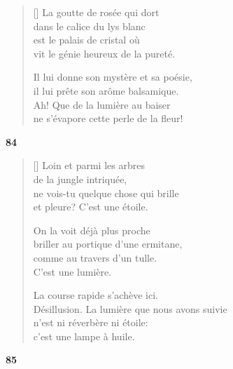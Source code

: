\documentclass[a4paper,12pt]{book}
\begin{document}
\settowidth{\versewidth}{Il lui donne son mystère et sa poésie,}


\begin{verse}[\versewidth]
  La goutte de rosée qui dort \\
  dans le calice du lys blanc \\
  est le palais de cristal où \\
  vit le génie heureux de la pureté.

  Il lui donne son mystère et sa poésie, \\
  il lui prête son arôme balsamique. \\
  Ah! Que de la lumière au baiser \\
  ne s'évapore cette perle de la fleur!
\end{verse}

\bigskip

\begin{center}
  \textbf{84}
\end{center}

\settowidth{\versewidth}{Désillusion. La lumière que nous avons suivie}

\begin{verse}[\versewidth]
  Loin et parmi les arbres \\
  de la jungle intriquée, \\
  ne vois-tu quelque chose qui brille \\
  et pleure? C'est une étoile.

  On la voit déjà plus proche \\
  briller au portique d'une ermitane, \\
  comme au travers d'un tulle. \\
  C'est une lumière.

  La course rapide s'achève ici. \\
  Désillusion. La lumière que nous avons suivie \\
  n'est ni réverbère ni étoile: \\
  c'est une lampe à huile.
\end{verse}

\bigskip

\begin{center}
  \textbf{85}
\end{center}
\end{document}
